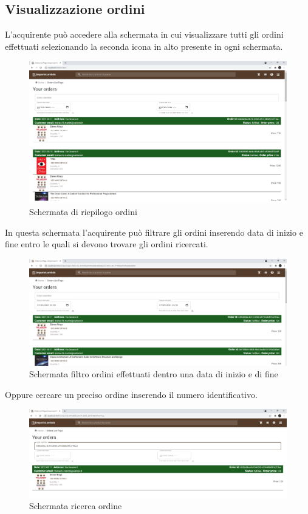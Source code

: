 \subsection{Visualizzazione ordini}\label{ordiniAcq}
L'acquirente può accedere alla schermata in cui visualizzare tutti gli ordini effettuati selezionando la seconda icona in alto presente in ogni schermata.
\begin{figure}[H]
	\centering
	\includegraphics[scale=0.3]{Immagini/Acquirente/orders.png}
	\caption{Schermata di riepilogo ordini}
	\label{fig:Ordini}
\end{figure}
In questa schermata l'acquirente può filtrare gli ordini inserendo data di inizio e fine entro le quali si devono trovare gli ordini ricercati.
\begin{figure}[H]
	\centering
	\includegraphics[scale=0.3]{Immagini/Acquirente/orders with date filters.png}
	\caption{Schermata filtro ordini effettuati dentro una data di inizio e di fine}
	\label{fig:OrdiniData}
\end{figure}
Oppure cercare un preciso ordine inserendo il numero identificativo.
\begin{figure}[H]
	\centering
	\includegraphics[scale=0.3]{Immagini/Acquirente/orders with search.png}
	\caption{Schermata ricerca ordine}
	\label{fig:OrdiniNumero}
\end{figure}
